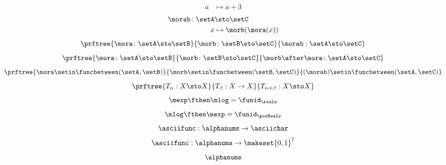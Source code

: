 {\begin{forslides}
\begin{equation}
\begin{aligned}
            a               & \mapsto a + 3
        \end{aligned}
    \end{equation}
    \begin{equation}
        \label{eq:funcomposition}
        \begin{aligned}
            \morab \colon \setA & \sto  \setC \\
            x                   & \mapsto \morb(\mora(x))
        \end{aligned}
    \end{equation}
    \begin{equation}
        \label{eq:funccomp1}
        \prftree{\mora \colon \setA \sto \setB}{\morb \colon \setB \sto \setC}{\morab : \setA \sto \setC}
    \end{equation}
    \begin{equation}
        \label{eq:funccomp2}
        \prftree{\mora \colon \setA \sto \setB}{\morb \colon \setB \sto \setC}{\morb \after \mora \colon \setA \sto \setC}
    \end{equation}
    \begin{equation}
        \label{eq:funccomp3}
        \prftree{%
            \mora \setin \funcbetween(\setA, \setB)}{%
            \morb \setin \funcbetween( \setB, \setC)}{
            (\morab) \setin \funcbetween( \setA, \setC)}
    \end{equation}
    \begin{equation}
        \label{eq:transitions}
        \prftree{T_\alpha: X \sto X }{T_\beta : X \to X}{T_{\alpha+\beta} : X \sto X}
    \end{equation}
    \begin{equation}
        \label{eq:explogid}
        \mexp \fthen \mlog = \funid_{\reals}
    \end{equation}
    \begin{equation}
        \label{eq:logexpid}
        \mlog \fthen \mexp = \funid_{\posReals}
    \end{equation}
    \begin{equation}
        \label{eq:ASCII-fun}
        \asciifunc: \alphanums \to \asciichar
    \end{equation}
    \begin{equation}
        \label{eq:ASCII-to-digits}
        \asciifunc: \alphanums \to \makeset{0,1}^7
    \end{equation}
    \begin{equation}
        \label{eq:alphanums}
        \alphanums

\end{equation}
\end{forslides}}
